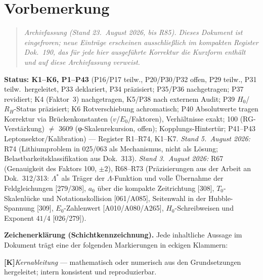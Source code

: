 
\section*{Vorbemerkung}
\begin{quote}\itshape Archivfassung (Stand 23.~August 2026, bis R85). Dieses Dokument ist eingefroren; neue Eintr\"age erscheinen ausschlie\ss{}lich im kompakten Register Dok.~190, das f\"ur jede hier ausgef\"uhrte Korrektur die Kurzform enth\"alt und auf diese Archivfassung verweist.\end{quote}


\textbf{Status: K1--K6, P1--P43} (P16/P17 teilw., P20/P30/P32 offen, P29 teilw., P31 teilw.~hergeleitet, P33 deklariert, P34 präzisiert; P35/P36 nachgetragen; P37 revidiert; K4 (Faktor~3) nachgetragen, K5/P38 nach externem Audit; P39 $H_0$/$R_H$-Status präzisiert; K6 Rotverschiebung achromatisch; P40 Absolutwerte tragen Korrektur via Brückenkonstanten ($v$/$E_0$/Faktoren), Verhältnisse exakt; 100 (RG-Verstärkung) $\neq$ 3609 (φ-Skalenrekursion, offen); Kopplungs-Hintertür; P41--P43 Leptonsektor/Kalibration) --- Register R1--R74, K1--K7. \emph{Stand 5.~August 2026:} R74 (Lithiumproblem in 025/063 als Mechanismus, nicht als Lösung; Belastbarkeitsklassifikation aus Dok.~313). \emph{Stand 3.~August 2026:} R67 (Genauigkeit des Faktors 100, $\pm2$), R68--R73 (Präzisierungen aus der Arbeit an Dok.~312/313: $\Lambda^{*}$ als Träger der $\Lambda$-Funktion und volle Übernahme der Feldgleichungen [279/308], $a_0$ über die kompakte Zeitrichtung [308], $T_0$-Skalenlücke und Notationskollision [061/A085], Seitenwahl in der Hubble-Spannung [309], $E_0$-Zahlenwert [A010/A080/A265], $H_0$-Schreibweisen und Exponent $41/4$ [026/279]).

\medskip
\noindent\textbf{Zeichenerklärung (Schichtkennzeichnung).}
Jede inhaltliche Aussage im Dokument trägt eine der folgenden
Markierungen in eckigen Klammern:

\smallskip
\smallskip\noindent \textbf{[K]}\quad \emph{Kernableitung} — mathematisch oder numerisch aus den Grundsetzungen hergeleitet; intern konsistent und reproduzierbar.

